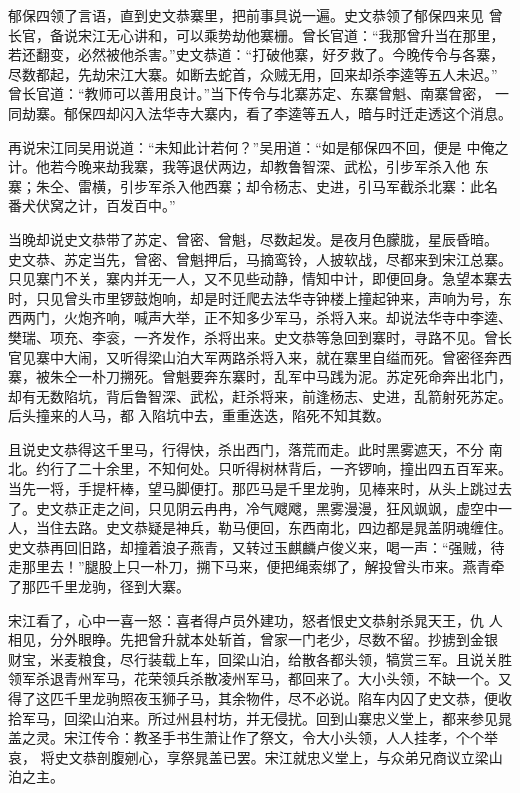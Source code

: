 郁保四领了言语，直到史文恭寨里，把前事具说一遍。史文恭领了郁保四来见
曾长官，备说宋江无心讲和，可以乘势劫他寨栅。曾长官道：“我那曾升当在那里，
若还翻变，必然被他杀害。”史文恭道：“打破他寨，好歹救了。今晚传令与各寨，
尽数都起，先劫宋江大寨。如断去蛇首，众贼无用，回来却杀李逵等五人未迟。”
曾长官道：“教师可以善用良计。”当下传令与北寨苏定、东寨曾魁、南寨曾密，
一同劫寨。郁保四却闪入法华寺大寨内，看了李逵等五人，暗与时迁走透这个消息。

再说宋江同吴用说道：“未知此计若何？”吴用道：“如是郁保四不回，便是
中俺之计。他若今晚来劫我寨，我等退伏两边，却教鲁智深、武松，引步军杀入他
东寨；朱仝、雷横，引步军杀入他西寨；却令杨志、史进，引马军截杀北寨：此名
番犬伏窝之计，百发百中。”

当晚却说史文恭带了苏定、曾密、曾魁，尽数起发。是夜月色朦胧，星辰昏暗。
史文恭、苏定当先，曾密、曾魁押后，马摘鸾铃，人披软战，尽都来到宋江总寨。
只见寨门不关，寨内并无一人，又不见些动静，情知中计，即便回身。急望本寨去
时，只见曾头市里锣鼓炮响，却是时迁爬去法华寺钟楼上撞起钟来，声响为号，东
西两门，火炮齐响，喊声大举，正不知多少军马，杀将入来。却说法华寺中李逵、
樊瑞、项充、李衮，一齐发作，杀将出来。史文恭等急回到寨时，寻路不见。曾长
官见寨中大闹，又听得梁山泊大军两路杀将入来，就在寨里自缢而死。曾密径奔西
寨，被朱仝一朴刀搠死。曾魁要奔东寨时，乱军中马践为泥。苏定死命奔出北门，
却有无数陷坑，背后鲁智深、武松，赶杀将来，前逢杨志、史进，乱箭射死苏定。
后头撞来的人马，都入陷坑中去，重重迭迭，陷死不知其数。

且说史文恭得这千里马，行得快，杀出西门，落荒而走。此时黑雾遮天，不分
南北。约行了二十余里，不知何处。只听得树林背后，一齐锣响，撞出四五百军来。
当先一将，手提杆棒，望马脚便打。那匹马是千里龙驹，见棒来时，从头上跳过去
了。史文恭正走之间，只见阴云冉冉，冷气飕飕，黑雾漫漫，狂风飒飒，虚空中一
人，当住去路。史文恭疑是神兵，勒马便回，东西南北，四边都是晁盖阴魂缠住。
史文恭再回旧路，却撞着浪子燕青，又转过玉麒麟卢俊义来，喝一声：“强贼，待
走那里去！”腿股上只一朴刀，搠下马来，便把绳索绑了，解投曾头市来。燕青牵
了那匹千里龙驹，径到大寨。

宋江看了，心中一喜一怒：喜者得卢员外建功，怒者恨史文恭射杀晁天王，仇
人相见，分外眼睁。先把曾升就本处斩首，曾家一门老少，尽数不留。抄掳到金银
财宝，米麦粮食，尽行装载上车，回梁山泊，给散各都头领，犒赏三军。且说关胜
领军杀退青州军马，花荣领兵杀散凌州军马，都回来了。大小头领，不缺一个。又
得了这匹千里龙驹照夜玉狮子马，其余物件，尽不必说。陷车内囚了史文恭，便收
拾军马，回梁山泊来。所过州县村坊，并无侵扰。回到山寨忠义堂上，都来参见晁
盖之灵。宋江传令：教圣手书生萧让作了祭文，令大小头领，人人挂孝，个个举哀，
将史文恭剖腹剜心，享祭晁盖已罢。宋江就忠义堂上，与众弟兄商议立梁山泊之主。

